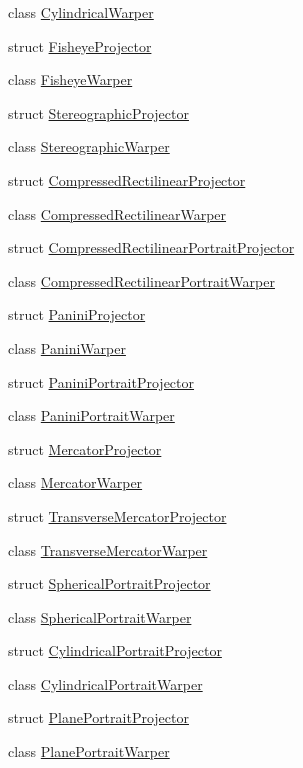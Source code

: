 \begin{DoxyCompactItemize}
class \hyperlink{classcv_1_1detail_1_1CylindricalWarper}{Cylindrical\-Warper}
\item 
struct \hyperlink{structcv_1_1detail_1_1FisheyeProjector}{Fisheye\-Projector}
\item 
class \hyperlink{classcv_1_1detail_1_1FisheyeWarper}{Fisheye\-Warper}
\item 
struct \hyperlink{structcv_1_1detail_1_1StereographicProjector}{Stereographic\-Projector}
\item 
class \hyperlink{classcv_1_1detail_1_1StereographicWarper}{Stereographic\-Warper}
\item 
struct \hyperlink{structcv_1_1detail_1_1CompressedRectilinearProjector}{Compressed\-Rectilinear\-Projector}
\item 
class \hyperlink{classcv_1_1detail_1_1CompressedRectilinearWarper}{Compressed\-Rectilinear\-Warper}
\item 
struct \hyperlink{structcv_1_1detail_1_1CompressedRectilinearPortraitProjector}{Compressed\-Rectilinear\-Portrait\-Projector}
\item 
class \hyperlink{classcv_1_1detail_1_1CompressedRectilinearPortraitWarper}{Compressed\-Rectilinear\-Portrait\-Warper}
\item 
struct \hyperlink{structcv_1_1detail_1_1PaniniProjector}{Panini\-Projector}
\item 
class \hyperlink{classcv_1_1detail_1_1PaniniWarper}{Panini\-Warper}
\item 
struct \hyperlink{structcv_1_1detail_1_1PaniniPortraitProjector}{Panini\-Portrait\-Projector}
\item 
class \hyperlink{classcv_1_1detail_1_1PaniniPortraitWarper}{Panini\-Portrait\-Warper}
\item 
struct \hyperlink{structcv_1_1detail_1_1MercatorProjector}{Mercator\-Projector}
\item 
class \hyperlink{classcv_1_1detail_1_1MercatorWarper}{Mercator\-Warper}
\item 
struct \hyperlink{structcv_1_1detail_1_1TransverseMercatorProjector}{Transverse\-Mercator\-Projector}
\item 
class \hyperlink{classcv_1_1detail_1_1TransverseMercatorWarper}{Transverse\-Mercator\-Warper}
\item 
struct \hyperlink{structcv_1_1detail_1_1SphericalPortraitProjector}{Spherical\-Portrait\-Projector}
\item 
class \hyperlink{classcv_1_1detail_1_1SphericalPortraitWarper}{Spherical\-Portrait\-Warper}
\item 
struct \hyperlink{structcv_1_1detail_1_1CylindricalPortraitProjector}{Cylindrical\-Portrait\-Projector}
\item 
class \hyperlink{classcv_1_1detail_1_1CylindricalPortraitWarper}{Cylindrical\-Portrait\-Warper}
\item 
struct \hyperlink{structcv_1_1detail_1_1PlanePortraitProjector}{Plane\-Portrait\-Projector}
\item 
class \hyperlink{classcv_1_1detail_1_1PlanePortraitWarper}{Plane\-Portrait\-Warper}
\end{DoxyCompactItemize}

